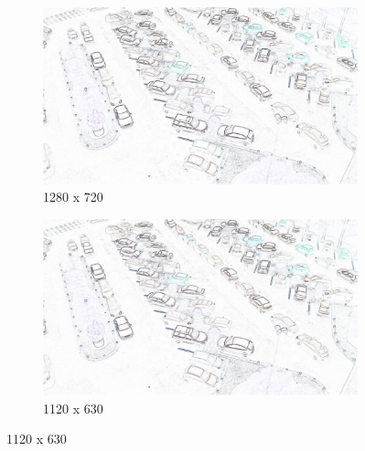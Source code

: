 \begin{figure}[H]
    \begin{subfigure}{.5\textwidth}
        \centering
        \includegraphics[width=.85\linewidth]{img/conception/image_process/edge-downsample/7.png}
        \caption{1280 x 720}
    \end{subfigure}%
    \begin{subfigure}{.5\textwidth}
        \centering
        \includegraphics[width=.85\linewidth]{img/conception/image_process/edge-downsample/6.png}
        \caption{1120 x 630}
    \end{subfigure}%


\end{figure}
